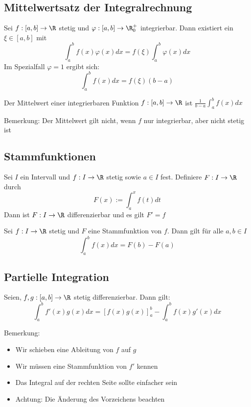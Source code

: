 	\subsection{Mittelwertsatz der Integralrechnung}
		\begin{Satz} [ ]
			Sei $f:[a, b]\to\R$ stetig und $\varphi:[a, b]\to\R_0^+$ integrierbar. Dann existiert ein $\xi\in[a, b]$ mit
			$$
				\int_a^bf(x)\varphi(x)dx=f(\xi)\int_a^b\varphi(x)dx
			$$
			Im Spezialfall $\varphi=1$ ergibt sich:
			$$
				\int_a^bf(x)dx=f(\xi)(b-a)
			$$
		\end{Satz}
		\begin{Definition} [ Mittelwert]
			Der Mittelwert einer integrierbaren Funktion $f:[a, b]\to\R$ ist $\frac{1}{b-a}\int_a^bf(x)dx$
		\end{Definition}
		Bemerkung:\newline
		Der Mittelwert gilt nicht, wenn $f$ nur integrierbar, aber nicht stetig ist
	\subsection{Stammfunktionen}
		\begin{Satz} [ ]
			Sei $I$ ein Intervall und $f:I\to\R$ stetig sowie $a\in I$ fest. Definiere $F:I\to\R$ durch
			$$
				F(x):=\int_a^xf(t)dt
			$$
			Dann ist $F:I\to\R$ differenzierbar und es gilt $F'=f$
		\end{Satz}
		\begin{Satz} 
			Sei $f:I\to\R$ stetig und $F$ eine Stammfunktion von $f$. Dann gilt für alle $a, b\in I$
			$$
				\int_a^bf(x)dx=F(b)-F(a)
			$$
		\end{Satz}
	\subsection{Partielle Integration}
		\begin{Satz} [ ]
			Seien, $f, g:[a, b]\to\R$ stetig differenzierbar. Dann gilt:
			$$
				\int_a^bf'(x)g(x)dx=[f(x)g(x)]_a^b-\int_a^bf(x)g'(x)dx
			$$
		\end{Satz}
		Bemerkung: \newline
		\begin{itemize}
			\item Wir schieben eine Ableitung von $f$ auf $g$
			\item Wir müssen eine Stammfunktion von $f'$ kennen
			\item Das Integral auf der rechten Seite sollte \glqq{}einfacher\grqq{} sein
			\item Achtung: Die Änderung des Vorzeichens beachten
		\end{itemize}
